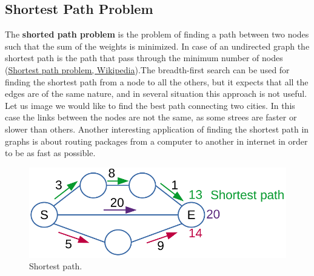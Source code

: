 \subsection{Shortest Path Problem}
The \textbf{shorted path problem} is the problem of finding a path between two nodes such that the sum of the weights is minimized. In case of an undirected graph the shortest path is the path that pass through the minimum number of nodes \cite{wikishortestpath} (\href{https://en.wikipedia.org/wiki/Shortest_path_problem}{Shortest path problem, Wikipedia}).The breadth-first search can be used for finding the shortest path from a node to all the others, but it expects that all the edges are of the same nature, and in several situation this approach is not useful. Let us image we would like to find the best path connecting two cities. In this case the links between the nodes are not the same, as some strees are faster or slower than others. Another interesting application of finding the shortest path in graphs is about routing packages from a computer to another in internet in order to be as fast as possible.

\begin{figure}[H]
	\begin{center}
		\includegraphics[scale=.6]{chapters/graphs/images/graphs_11.pdf}
		\caption[Shortest path.]{Shortest path.}
		\label{graphs_11}
	\end{center}
\end{figure}

